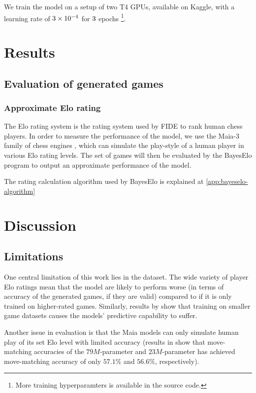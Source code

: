 \documentclass[11pt, a4paper]{article}
\begin{document}
We train the model on a setup of two T4 GPUs, available on Kaggle, with a learning rate of \(3 \times 10^{-4}\) for \(3\) epochs \footnote{More training hyperparamters is available in the source code.}.
\section{Results} \label{sec:results}

\subsection{Evaluation of generated games}

\subsubsection{Approximate Elo rating}

The Elo rating system \citep{elo-1967} is the rating system used by FIDE to rank human chess players. In order to measure the performance of the model, we use the Maia-3 family of chess engines \citep{monroe-2025}, which can simulate the play-style of a human player in various Elo rating levels. The set of games will then be evaluated by the BayesElo \citep{coulom-2010} program to output an approximate performance of the model.


The rating calculation algorithm used by BayesElo is explained at \cref{app:bayeselo-algorithm}

\section{Discussion}

\subsection{Limitations}

One central limitation of this work lies in the dataset. The wide variety of player Elo ratings mean that the model are likely to perform worse (in terms of accuracy of the generated games, if they are valid) compared to if it is only trained on higher-rated games. Similarly, results by \citep{toshniwal-2022} show that training on smaller game datasets causes the models' predictive capability to suffer.

Another issue in evaluation is that the Maia models can only simulate human play of its set Elo level with limited accuracy (results in \citet{monroe-2025} show that move-matching accuracies of the \(79M\)-parameter and \(23M\)-parameter has achieved move-matching accuracy of only \(57.1\%\) and \(56.6\%\), respectively).
\end{document}
